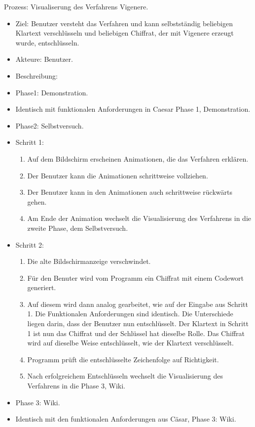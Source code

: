 \documentclass{article}
\begin{document}
\begin{FA}[start=100]
 \item Prozess: Visualiserung des Verfahrens Vigenere.
\end{FA}
\begin{itemize}[label={}]
 \item Ziel: Benutzer versteht das Verfahren und kann selbstständig beliebigen Klartext verschlüsseln und beliebigen Chiffrat, 
       der mit Vigenere erzeugt wurde, entschlüsseln.
 \item Akteure: Benutzer.
 \item Beschreibung:
 \item Phase1: Demonstration.
 \item Identisch mit funktionalen Anforderungen in Caesar Phase 1, Demonstration. 
 \item Phase2: Selbstversuch.
 \item Schritt 1:
 \begin{enumerate}
  \item Auf dem Bildschirm erscheinen Animationen, die das Verfahren erklären.
  \item Der Benutzer kann die Animationen schrittweise vollziehen.
  \item Der Benutzer kann in den Animationen auch schrittweise rückwärts gehen. 
  \item Am Ende der Animation wechselt die Visualisierung des Verfahrens in die zweite Phase, dem Selbstversuch.
 \end{enumerate}
 \item Schritt 2:
 \begin{enumerate}
  \item Die alte Bildschirmanzeige verschwindet.
  \item Für den Benuter wird vom Programm ein Chiffrat mit einem Codewort generiert. 
  \item[] Auf diesem wird dann analog gearbeitet, wie auf der Eingabe aus Schritt 1. Die Funktionalen Anforderungen sind identisch.
        Die Unterschiede liegen darin, dass der Benutzer nun entschlüsselt. 
        Der Klartext in Schritt 1 ist nun das Chiffrat und der Schlüssel hat dieselbe Rolle.
        Das Chiffrat wird auf dieselbe Weise entschlüsselt, wie der Klartext verschlüsselt. 
  \item Programm prüft die entschlüsselte Zeichenfolge auf Richtigkeit.
  \item Nach erfolgreichem Entschlüsseln wechselt die Visualisierung des Verfahrens in die Phase 3, Wiki.
 \end{enumerate}
 \item Phase 3: Wiki.
 \item Identisch mit den funktionalen Anforderungen aus Cäsar, Phase 3: Wiki.
\end{itemize}
\end{document}
